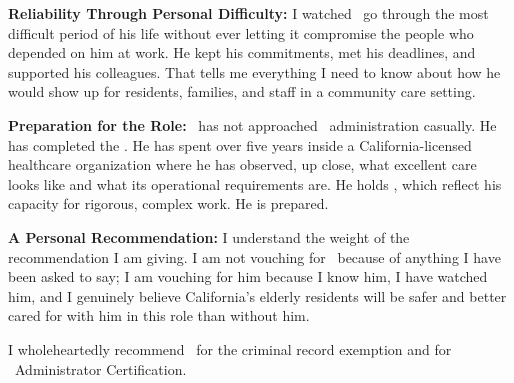\textbf{Reliability Through Personal Difficulty:} I watched \ApplicantName\ go through the most difficult period of his life without ever letting it compromise the people who depended on him at work. He kept his commitments, met his deadlines, and supported his colleagues. That tells me everything I need to know about how he would show up for residents, families, and staff in a community care setting.

\textbf{Preparation for the Role:} \ApplicantName\ has not approached \FacilityTypeShort\ administration casually. He has completed the \RCFETraining. He has spent over five years inside a California-licensed healthcare organization where he has observed, up close, what excellent care looks like and what its operational requirements are. He holds \EducationDegrees, which reflect his capacity for rigorous, complex work. He is prepared.

\textbf{A Personal Recommendation:} I understand the weight of the recommendation I am giving. I am not vouching for \ApplicantName\ because of anything I have been asked to say; I am vouching for him because I know him, I have watched him, and I genuinely believe California's elderly residents will be safer and better cared for with him in this role than without him.

I wholeheartedly recommend \ApplicantName\ for the criminal record exemption and for \FacilityTypeShort\ Administrator Certification.

\licsignatureblock
